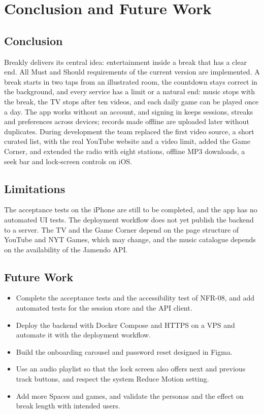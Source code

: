 \chapter*{Conclusion and Future Work}

\section*{Conclusion}

Breakly delivers its central idea: entertainment inside a break that has a
clear end. All Must and Should requirements of the current version are
implemented. A break starts in two taps from an illustrated room, the
countdown stays correct in the background, and every service has a limit or a
natural end: music stops with the break, the TV stops after ten videos, and
each daily game can be played once a day. The app works without an account,
and signing in keeps sessions, streaks and preferences across devices; records
made offline are uploaded later without duplicates. During development the
team replaced the first video source, a short curated list, with the real
YouTube website and a video limit, added the Game Corner, and extended the
radio with eight stations, offline MP3 downloads, a seek bar and lock-screen
controls on iOS.

\section*{Limitations}

The acceptance tests on the iPhone are still to be completed, and the app has
no automated UI tests. The deployment workflow does not yet publish the
backend to a server. The TV and the Game Corner depend on the page structure
of YouTube and NYT Games, which may change, and the music catalogue depends on
the availability of the Jamendo API.

\section*{Future Work}

\begin{itemize}[leftmargin=1.8em,itemsep=2pt]
  \item Complete the acceptance tests and the accessibility test of NFR-08, and
        add automated tests for the session store and the API client.
  \item Deploy the backend with Docker Compose and HTTPS on a VPS and
        automate it with the deployment workflow.
  \item Build the onboarding carousel and password reset designed in Figma.
  \item Use an audio playlist so that the lock screen also offers next and
        previous track buttons, and respect the system Reduce Motion setting.
  \item Add more Spaces and games, and validate the personas and the effect
        on break length with intended users.
\end{itemize}
